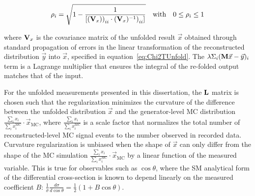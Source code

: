 \begin{linenomath*}
\begin{align}
\rho_{i} = \sqrt{1 - \frac{1}{[{(\mathbf{V}_{x}))}_{ii} \cdot {(\mathbf{V}_{x})^{-1})}_{ii}]}} \quad \text{with} \quad 0 \leq \rho_{i} \leq 1
\end{align}
\end{linenomath*}
where $\mathbf{V}_{x}$ is the covariance matrix of the unfolded result $\vec{x}$ obtained through standard propagation of errors in the linear transformation of the reconstructed distribution $\vec{y}$ into $\vec{x}$, specified in equation~\ref{eq:Chi2TUnfold}.
The $\lambda\Sigma_{i}(\mathbf{M}\vec{x}-\vec{y})_{i}$ term is a Lagrange multiplier that ensures the integral of the re-folded output matches that of the input.

For the unfolded measurements presented in this dissertation, the $\mathbf{L}$ matrix is chosen such that the regularization minimizes the curvature of the difference between the unfolded distribution $\vec{x}$ and the generator-level MC distribution $\frac{\sum_i x_i}{\sum_i x^{\text{MC}}_i} \cdot \vec{x}_{\text{MC}}$, where $\frac{\sum_i x_i}{\sum_i x^{\text{MC}}_i}$ is a scale factor that normalizes the total number of reconstructed-level MC signal events to the number observed in recorded data.
Curvature regularization is unbiased when the shape of $\vec{x}$ can only differ from the shape of the MC simulation $\frac{\sum_i x_i}{\sum_i x^{\text{MC}}_i} \cdot \vec{x}_{\text{MC}}$ by a linear function of the measured variable. 
This is true for observables such as $\cos\theta$, where the SM analytical form of the differential cross-section is known to depend linearly on the measured coefficient $B$: $\tfrac{1}{\sigma}\tfrac{d\sigma}{d\cos\theta} = \tfrac{1}{2} (1+B \cos\theta)$. 

